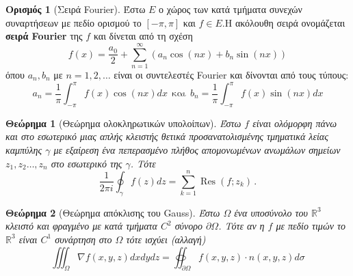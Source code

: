 \documentclass[a4paper]{article}
\newtheorem{theorem}{Θεώρημα}
\DeclareMathOperator{\Res}{Res}
\theoremstyle{definition}
\newtheorem{definition}{Ορισμός}
\begin{document}
\begin{definition}[Σειρά Fourier]
Έστω $ E $ ο χώρος των κατά τμήματα συνεχών συναρτήσεων με πεδίο ορισμού το $ [-\pi,\pi] $ και $ f\in E $.H ακόλουθη σειρά ονομάζεται \textbf{σειρά Fourier} της $ f $ και δίνεται από τη σχέση
\[ f(x)=\frac{a_0}{2}+\sum_{n=1}^{\infty}{(a_n\cos{(nx)}+b_n\sin{(nx)})} \]
όπου $ a_n,b_n $ με $ n=1,2,\ldots $ είναι οι συντελεστές Fourier και δίνονται από τους τύπους:
\[ a_n=\frac{1}{\pi}\int_{-\pi}^{\pi}{f(x)\cos{(nx)}}d x\ \ \textrm{και}\ \ b_n=\frac{1}{\pi}\int_{-\pi}^{\pi}{f(x)\sin{(nx)}}d x \]
\end{definition}

\begin{theorem}[Θεώρημα ολοκληρωτικών υπολοίπων]
Έστω $ f $ είναι ολόμορφη πάνω και στο εσωτερικό μιας απλής κλειστής θετικά προσανατολισμένης τμηματικά λείας καμπύλης $ \gamma $ με εξαίρεση ένα πεπερασμένο πλήθος απομονωμένων ανωμάλων σημείων $ z_1,z_2\ldots,z_n $ στο εσωτερικό της $ \gamma $. Τότε
\[
  \frac{1}{2\pi i}\oint_\gamma\! f(z)dz = \sum_{k=1}^n\Res(f;z_k)\,.
\]
\end{theorem}

\begin{theorem}[Θεώρημα απόκλισης του Gauss]
Έστω $ \Omega $ ένα υποσύνολο του $ \mathbb{R}^3 $ κλειστό και φραγμένο με κατά τμήματα $ C^2 $ σύνορο $ \partial\Omega $. Τότε αν η $ f $ με πεδίο τιμών το $ \mathbb{R}^3 $ είναι $ C^1 $ συνάρτηση στο $ \Omega $ τότε ισχύει (αλλαγή)
\[
 \iiint_{\Omega}{\nabla f(x,y,z)dxdydz}=\oiint_{\partial\Omega}{f(x,y,z)\cdot n(x,y,z)d\sigma}
\]
\end{theorem}
\end{document}
